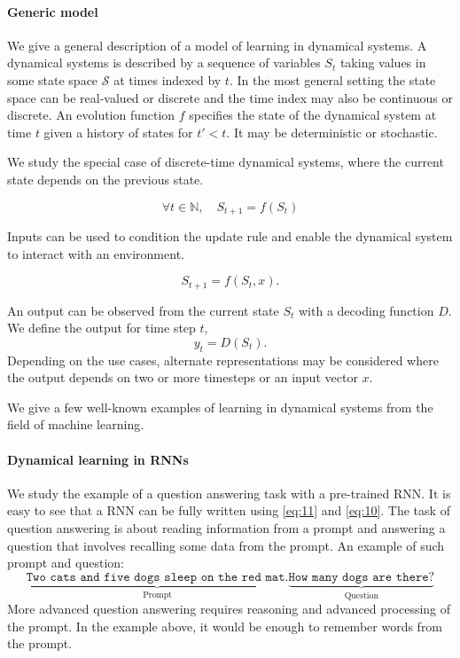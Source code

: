 \paragraph{Generic model}\label{sec:generic-model}
We give a general description of a model of learning in dynamical systems. A
dynamical systems is described by a sequence of variables $S_{t}$ taking values
in some state space $\mathcal{S}$ at times indexed by $t$. In the most general setting the
state space can be real-valued or discrete and the time index may also be
continuous or discrete. An evolution function $f$ specifies the state of the
dynamical system at time $t$ given a history of states for $t' < t$. It may be
deterministic or stochastic.

We study the special case of discrete-time dynamical systems, where the current
state depends on the previous state.

\begin{equation}
  \forall t \in \mathbb{N},\quad S_{t + 1} = f(S_{t})
  \label{eq:dyn-update}
\end{equation}

Inputs can be used to condition the update rule and enable the dynamical system
to interact with an environment.

\begin{equation}
S_{t+1} = f(S_t, x).
\label{eq:11}
\end{equation}

An output can be observed from the current state $S_t$ with a decoding function
$D$. We define the output for time step $t$,
\begin{equation}
  \label{eq:10}
  y_t = D(S_t).
\end{equation}
Depending on the use cases, alternate representations may be considered where
the output depends on two or more timesteps or an input vector $x$. \item

We give a few well-known examples of learning in dynamical systems from the
field of machine learning.

\paragraph{Dynamical learning in \acp{RNN}}\label{sec:dynam-learn-acprnn}
We study the example of a question answering task with a pre-trained \ac{RNN}.
It is easy to see that a \ac{RNN} can be fully written using \eqref{eq:11} and
\eqref{eq:10}. The task of question answering is about reading information from
a prompt and answering a question that involves recalling some data from the
prompt. An example of such prompt and question:
\begin{equation*}
  \underbrace{\texttt{Two cats and five dogs sleep on the red mat.}}_{\text{Prompt}}
  \underbrace{\texttt{How many dogs are there?}}_{\text{Question}}
\end{equation*}
More advanced question answering requires reasoning and advanced processing of
the prompt. In the example above, it would be enough to remember words from the
prompt.

